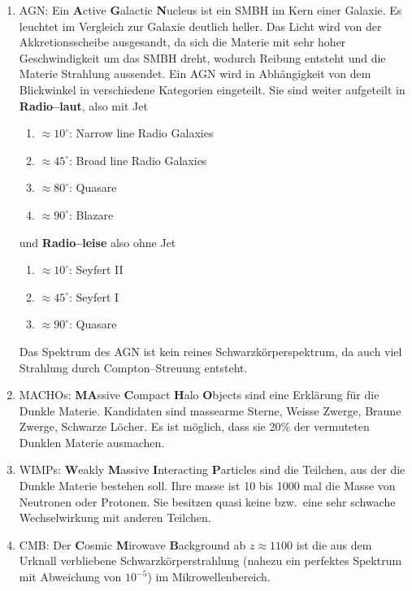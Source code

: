 \documentclass[a4paper,12pt]{article}
\numberwithin{equation}{section}
\begin{document}
\begin{enumerate}[label=$\circ$]
        \item AGN: Ein \textbf{A}ctive \textbf{G}alactic \textbf{N}ucleus ist ein SMBH im Kern einer Galaxie. Es leuchtet im Vergleich zur Galaxie deutlich heller. Das Licht wird von der Akkretionsscheibe ausgesandt, da sich die Materie mit sehr hoher Geschwindigkeit um das SMBH dreht, wodurch Reibung entsteht und die Materie Strahlung aussendet. Ein AGN wird in Abhängigkeit von dem Blickwinkel in verschiedene Kategorien eingeteilt. Sie sind weiter aufgeteilt in \textbf{Radio--laut}, also mit Jet 
                \begin{enumerate}[label=]
                        \item $\approx 10^\circ$: Narrow line Radio Galaxies
                        \item $\approx 45^\circ$: Broad line Radio Galaxies
                        \item $\approx 80^\circ$: Quasare
                        \item $\approx 90^\circ$: Blazare
                \end{enumerate}
                und \textbf{Radio--leise} also ohne Jet 
                \begin{enumerate}[label=]
                        \item $\approx 10^\circ$: Seyfert II
                        \item $\approx 45^\circ$: Seyfert I
                        \item $\approx 90^\circ$: Quasare
                \end{enumerate}
                Das Spektrum des AGN ist kein reines Schwarzkörperspektrum, da auch viel Strahlung durch Compton--Streuung entsteht.
        \item MACHOs: \textbf{MA}ssive \textbf{C}ompact \textbf{H}alo \textbf{O}bjects sind eine Erklärung für die Dunkle Materie. Kandidaten sind massearme Sterne, Weisse Zwerge, Braune Zwerge, Schwarze Löcher. Es ist möglich, dass sie 20\% der vermuteten Dunklen Materie ausmachen.
        \item WIMPs: \textbf{W}eakly \textbf{M}assive \textbf{I}nteracting \textbf{P}articles sind die Teilchen, aus der die Dunkle Materie bestehen soll. Ihre masse ist 10 bis 1000 mal die Masse von Neutronen oder Protonen. Sie besitzen quasi keine bzw.\ eine sehr schwache Wechselwirkung mit anderen Teilchen.
        \item CMB: Der \textbf{C}osmic \textbf{M}irowave \textbf{B}ackground ab $z\approx 1100$ ist die aus dem Urknall verbliebene Schwarzkörperstrahlung (nahezu ein perfektes Spektrum mit Abweichung von $10^{-5}$) im Mikrowellenbereich. 

\end{enumerate}
\end{document}
